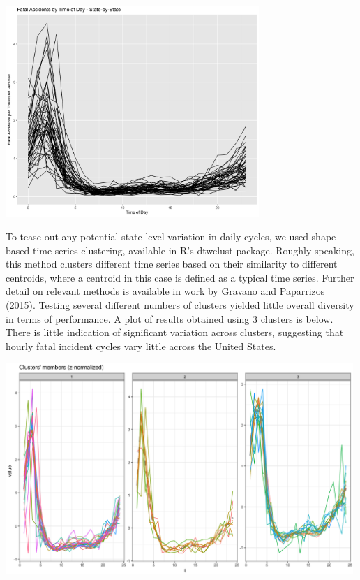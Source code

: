 \documentclass[11pt, oneside,titlepage]{article}   	%
\begin{document}
\begin{center}
\includegraphics[width=.75\textwidth, height=8cm,keepaspectratio]{WeightedStatePlot.png}
\end{center}

To tease out any potential state-level variation in daily cycles, we used shape-based time series clustering, available in R's dtwclust package. Roughly speaking, this method clusters different time series based on their similarity to different centroids, where a centroid in this case is defined as a typical time series. Further detail on relevant methods is available in work by Gravano and Paparrizos (2015). Testing several different numbers of clusters yielded little overall diversity in terms of performance. A plot of results obtained using 3 clusters is below. There is little indication of significant variation across clusters, suggesting that hourly fatal incident cycles vary little across the United States.

\begin{center}
\includegraphics[width=.75\textwidth,height=8cm,keepaspectratio]{StateClusterPlot_Hourly.png}
\end{center}
\end{document}
